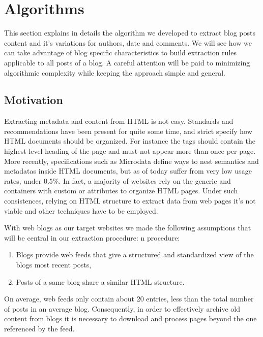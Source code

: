 \section{Algorithms}

This section explains in details the algorithm we developed to extract blog posts content and it's variations for authors, date and comments. We will see how we can take advantage of blog specific characteristics to build extraction rules applicable to all posts of a blog. A careful attention will be paid to minimizing algorithmic complexity while keeping the approach simple and general.


\subsection{Motivation}
Extracting metadata and content from HTML is not easy. Standards and recommendations have been present for quite some time, and strict specify how HTML documents should be organized. For instance the  tags should contain the highest-level heading of the page and must not appear more than once per page\cite{w3c2002}. More recently, specifications such as Microdata\cite{whatwg2013} define ways to nest semantics and metadatas inside HTML documents, but as of today suffer from very low usage rates, under 0.5\%\cite{andrewrogers2013}. In fact, a majority of websites rely on the generic  and  containers with custom  or  attributes to organize HTML pages. Under such consistences, relying on HTML structure to extract data from web pages it's not viable and other techniques have to be employed.


With web blogs as our target websites we made the following assumptions that will be central in our extraction procedure:
n procedure:
\begin{enumerate}[label={(\arabic*)}]
  \item \label{havefeedAssum} Blogs provide web feeds that give a structured and standardized view of the blogs most recent posts,
  \item \label{similarhtmlAssum} Posts of a same blog share a similar HTML structure.
\end{enumerate}
On average, web feeds only contain about 20 entries\cite{oita2010}, less than the total number of posts in an average blog. Consequently, in order to effectively archive old content from blogs it is necessary to download and process pages beyond the one referenced by the feed.


